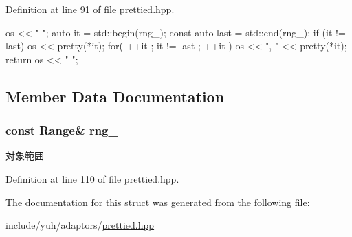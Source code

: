 \-Definition at line 91 of file prettied.\-hpp.


\begin{DoxyCode}
            {
                os << "{ ";
                auto it = std::begin(rng_);
                const auto last = std::end(rng_);
                if (it != last)
                { 
                    os << pretty(*it);
                    for( ++it ; it != last ; ++it )
                    {
                        os << ", " << pretty(*it);
                    }
                }
                return os << " }";
            }
\end{DoxyCode}


\subsection{\-Member \-Data \-Documentation}
\hypertarget{structyuh_1_1range__detail_1_1range__io_a1dc23cf32ae84636d442489c9629b987}{
\subsubsection[{rng\-\_\-}]{\setlength{\rightskip}{0pt plus 5cm}const \-Range\& {\bf rng\-\_\-}}}\label{da/d75/structyuh_1_1range__detail_1_1range__io_a1dc23cf32ae84636d442489c9629b987}
対象範囲 

\-Definition at line 110 of file prettied.\-hpp.



\-The documentation for this struct was generated from the following file\-:\begin{DoxyCompactItemize}
\item 
include/yuh/adaptors/\hyperlink{prettied_8hpp}{prettied.\-hpp}\end{DoxyCompactItemize}
